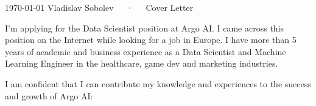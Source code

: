 \documentclass[11pt, a4paper]{awesome-cv}
\newcommand\companyname{Argo AI}
\begin{document}
\makecvheader[R]

\makecvfooter
  {\today}
  {Vladislav Sobolev~~~·~~~Cover Letter}
  {}

\makelettertitle

\begin{cvletter}



I'm applying for the Data Scientist position at {\companyname}. I came across this position on the Internet while looking for a job in Europe. I have more than 5 years of academic and business experience as a Data Scientist and Machine Learning Engineer in the healthcare, game dev and marketing industries.


I am confident that I can contribute my knowledge and experiences to the success and growth of {\companyname}:

\bigskip
\begin{cvitems}
  

\end{cvitems}
\end{cvletter}
\end{document}
